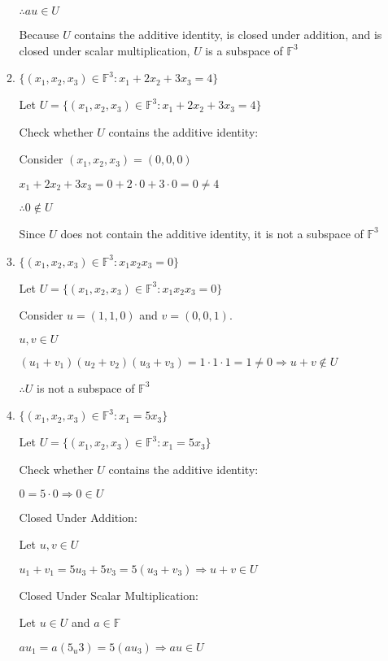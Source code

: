 \documentclass{article}
\begin{document}
\begin{enumerate}[nolistsep]
\begin{enumerate}[nolistsep]
			$\therefore au \in U$
			
			Because $U$ contains the additive identity, is closed under addition, and is closed under scalar multiplication, $U$ is a subspace of $\mathbb{F}^3$
			
			\item ${\{(x_1, x_2, x_3) \in \mathbb{F}^3 : x_1 + 2x_2 + 3x_3 = 4 \}}$
			
			Let $U = {\{(x_1, x_2, x_3) \in \mathbb{F}^3 : x_1 + 2x_2 + 3x_3 = 4 \}}$
			
			Check whether $U$ contains the additive identity:
			
			Consider $(x_1, x_2, x_3) = (0, 0, 0)$
			
			$x_1 + 2x_2 + 3x_3 = 0 + 2 \cdot 0 + 3 \cdot 0 = 0 \neq 4$
			
			$\therefore 0 \notin U$
			
			Since $U$ does not contain the additive identity, it is not a subspace of $\mathbb{F}^3$

			\item ${\{(x_1, x_2, x_3) \in \mathbb{F}^3 : x_1x_2x_3 = 0 \}}$
			
			Let $U = {\{(x_1, x_2, x_3) \in \mathbb{F}^3 : x_1x_2x_3 = 0 \}}$
			
			Consider $u = (1, 1, 0)$ and $v = (0, 0, 1)$.
			
			$u, v \in U$
			
			$(u_1 + v_1)(u_2 + v_2)(u_3 + v_3) = 1 \cdot 1 \cdot 1 = 1 \neq 0 \Rightarrow u + v \notin U$
			
			$\therefore U$ is not a subspace of $\mathbb{F}^3$
			
			
			\item ${\{(x_1, x_2, x_3) \in \mathbb{F}^3 : x_1 = 5x_3 \}}$
			
			Let $U = \{(x_1, x_2, x_3) \in \mathbb{F}^3 : x_1 = 5x_3 \}$
			
			Check whether $U$ contains the additive identity:
			
			
			$0 = 5 \cdot 0 \Rightarrow 0 \in U$
			
			Closed Under Addition:
			
			Let $u, v \in U$
			
			$u_1 + v_1 = 5u_3 + 5v_3 = 5(u_3 + v_3) \Rightarrow u + v \in U$
			
			Closed Under Scalar Multiplication:
			
			Let $u \in U$ and $a \in \mathbb{F}$
			
			$au_1 = a(5_u3) = 5(au_3) \Rightarrow au \in U$
			

\end{enumerate}
\end{enumerate}
\end{document}
